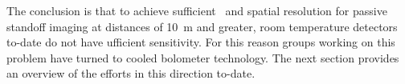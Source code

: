 The conclusion is that to achieve sufficient \NETD\ and spatial resolution for passive standoff imaging at distances of \SI{10}{\m} and greater, room temperature detectors to-date do not have ufficient sensitivity.
For this reason groups working on this problem have turned to cooled bolometer technology.
The next section provides an overview of the efforts in this direction to-date.

% 
